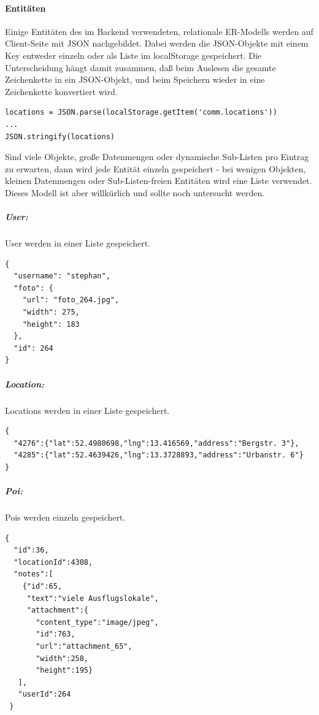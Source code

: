 \paragraph{Entitäten}
Einige Entitäten des im Backend verwendeten, relationale ER-Modells werden auf Client-Seite mit JSON nachgebildet. Dabei werden die JSON-Objekte mit einem Key entweder einzeln oder als Liste im localStorage gespeichert. Die Unterscheidung hängt damit zusammen, daß beim Auslesen die gesamte Zeichenkette in ein JSON-Objekt, und beim Speichern wieder in eine Zeichenkette konvertiert wird.
\lstset{language=JavaScript}
\begin{lstlisting}[frame=single,xleftmargin=0pt,numbers=none]
locations = JSON.parse(localStorage.getItem('comm.locations'))
...
JSON.stringify(locations)
\end{lstlisting}
Sind viele Objekte, große Datenmengen oder dynamische Sub-Listen pro Eintrag zu erwarten, dann wird jede Entität einzeln gespeichert - bei wenigen Objekten, kleinen Datenmengen oder Sub-Listen-freien Entitäten wird eine Liste verwendet. Dieses Modell ist aber willkürlich und sollte noch untersucht werden.

\subparagraph{User:}
User werden in einer Liste gespeichert.
\lstset{language=JavaScript}
\begin{lstlisting}[frame=single,xleftmargin=0pt,numbers=none,caption={localStorage - key: comm.users },captionpos=b]
{
  "username": "stephan",
  "foto": {
    "url": "foto_264.jpg",
    "width": 275,
    "height": 183
  },
  "id": 264
}
\end{lstlisting}

\subparagraph{Location:}
Locations werden in einer Liste gespeichert.
\lstset{language=JavaScript}
\begin{lstlisting}[frame=single,xleftmargin=0pt,numbers=none,caption={localStorage - key: comm.locations },captionpos=b]
{
  "4276":{"lat":52.4980698,"lng":13.416569,"address":"Bergstr. 3"},
  "4285":{"lat":52.4639426,"lng":13.3728893,"address":"Urbanstr. 6"}
}
\end{lstlisting}

\subparagraph{Poi:}
Pois werden einzeln gespeichert.
\lstset{language=JavaScript}
\begin{lstlisting}[frame=single,xleftmargin=0pt,numbers=none,caption={localStorage - key: comm.poi.36},captionpos=b]
{
  "id":36,
  "locationId":4308,
  "notes":[
    {"id":65,
     "text":"viele Ausflugslokale",
     "attachment":{
       "content_type":"image/jpeg",
       "id":763,
       "url":"attachment_65",
       "width":258,
       "height":195}
   ],
   "userId":264
 }
\end{lstlisting}

